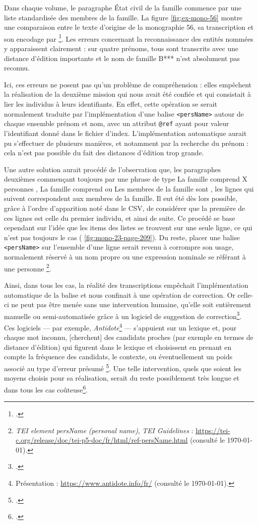 Dans chaque volume, le paragraphe \og État civil de la famille \fg{} commence par une liste standardisée des membres de la famille. La figure \ref{fig:ex-mono-56} montre une comparaison entre le texte d'origine de la monographie 56, sa transcription et son encodage par \lse\footcite[p. 4]{mono056a}. Les erreurs concernant la reconnaissance des entités nommées y apparaissent clairement : sur quatre prénoms, tous sont transcrits avec une distance d'édition importante et le nom de famille \og B*** \fg{} n'est absolument pas reconnu.

Ici, ces erreurs ne posent pas qu'un problème de compréhension : elles empêchent la réalisation de la deuxième mission qui nous avait été confiée et qui consistait à lier les individus à leurs identifiants. En effet, cette opération se serait normalement traduite par l'implémentation d'une balise \texttt{<persName>} autour de chaque ensemble prénom et nom, avec un attribut \texttt{@ref} ayant pour valeur l'identifiant donné dans le fichier d'index. L'implémentation automatique aurait pu s'effectuer de plusieurs manières, et notamment par la recherche du prénom : cela n'est pas possible du fait des distances d'édition trop grande.

Une autre solution aurait procédé de l'observation que, les paragraphes deuxièmes commençant toujours par une phrase de type \og La famille comprend X personnes \fg{}, \og La famille comprend \fg{} ou \og Les membres de la famille sont \fg{}, les lignes qui suivent correspondent aux membres de la famille. Il eut été dès lors possible, grâce à l'ordre d'apparition noté dans le CSV, de considérer que la première de ces lignes est celle du premier individu, et ainsi de suite. Ce procédé se base cependant sur l'idée que les items des listes se trouvent sur une seule ligne, ce qui n'est pas toujours le cas (\fig{} \ref{fig:mono-23-page-209}). Du reste, placer une balise \texttt{<persName>} sur l'ensemble d'une ligne serait revenu à corrompre son usage, normalement réservé à \og un nom propre ou une expression nominale se référant à une personne \fg{}\footnote{\textit{TEI element persName (personal name)}, \textit{TEI Guidelines} : \url{https://tei-c.org/release/doc/tei-p5-doc/fr/html/ref-persName.html} (consulté le \today).}.

Ainsi, dans tous les cas, la réalité des transcriptions empêchait l'implémentation automatique de la balise et nous confinait à une opération de correction.  Or celle-ci ne peut pas être menée sans une intervention humaine, qu'elle soit entièrement manuelle ou semi-automatisée grâce à un logiciel de suggestion de correction\footcite[p. 1]{sagot}. Ces logiciels --- par exemple, \textit{Antidote}\footnote{Présentation : \url{https://www.antidote.info/fr/} (consulté le \today).} --- s'appuient sur un lexique et, \og pour chaque mot inconnu, [cherchent] des candidats proches (par exemple en termes de distance d’édition) qui figurent dans le lexique et choisissent en prenant en compte la fréquence des candidats, le contexte, ou éventuellement un poids associé au type d’erreur présumé \fg{}\footcite[p. 1-2]{sagot}. Une telle intervention, quels que soient les moyens choisis pour sa réalisation, serait du reste possiblement très longue et dans tous les cas coûteuse\footcite[p. 14]{en-tal}.

